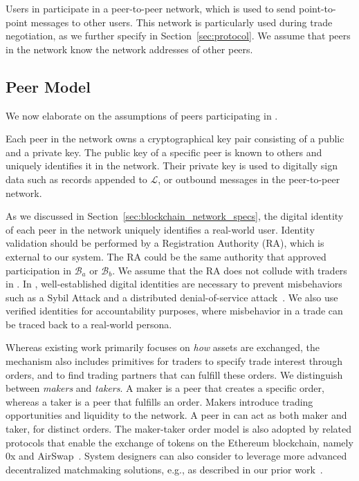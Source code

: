 Users in \ModelName{} participate in a peer-to-peer network, which is used to send point-to-point messages to other users.
This network is particularly used during trade negotiation, as we further specify in Section~\ref{sec:protocol}.
We assume that peers in the \ModelName{} network know the network addresses of other peers.

\subsection{Peer Model}
We now elaborate on the assumptions of peers participating in \ModelName{}.

Each peer in the \ModelName{} network owns a cryptographical key pair consisting of a public and a private key. 
The public key of a specific peer is known to others and uniquely identifies it in the network. 
Their private key is used to digitally sign data such as records appended to $ \mathcal{L} $, or outbound messages in the peer-to-peer network.

As we discussed in Section~\ref{sec:blockchain_network_specs}, the digital identity of each peer in the \ModelName{} network uniquely identifies a real-world user.
Identity validation should be performed by a Registration Authority (RA), which is external to our system.
The RA could be the same authority that approved participation in $ \mathcal{B}_a $ or $ \mathcal{B}_b $.
We assume that the RA does not collude with traders in \ModelName{}.
In \ModelName{}, well-established digital identities are necessary to prevent misbehaviors such as a Sybil Attack and a distributed denial-of-service attack~\cite{douceur2002sybil,Specht2004DistributedDO}.
We also use verified identities for accountability purposes, where misbehavior in a trade can be traced back to a real-world persona.

Whereas existing work primarily focuses on \emph{how} assets are exchanged, the \ModelName{} mechanism also includes primitives for traders to specify trade interest through orders, and to find trading partners that can fulfill these orders.
We distinguish between \emph{makers} and \emph{takers}.
A maker is a peer that creates a specific order, whereas a taker is a peer that fulfills an order.
Makers introduce trading opportunities and liquidity to the \ModelName{} network.
A peer in \ModelName{} can act as both maker and taker, for distinct orders.
The maker-taker order model is also adopted by related protocols that enable the exchange of tokens on the Ethereum blockchain, namely 0x and AirSwap~\cite{warren20170x,airswap}.
System designers can also consider to leverage more advanced decentralized matchmaking solutions, e.g., as described in our prior work~\cite{vos2020match}.

